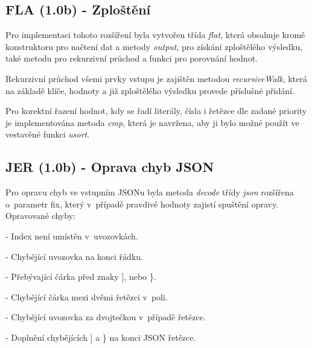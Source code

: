 \documentclass[10pt,a4paper]{article}
\begin{document}
	\subsection{FLA (1.0b) - Zploštění}
		Pro implementaci tohoto rozšíření byla vytvořen třída \textit{flat}, která obsahuje kromě konstruktoru pro načtení dat a metody \textit{output}, pro získání zploštělého výsledku, také metodu pro rekurzivní průchod a funkci pro porovnání hodnot.
		
		Rekurzivní průchod všemi prvky vstupu je zajištěn metodou \textit{recursiveWalk}, která na základě klíče, hodnoty a již zploštělého výsledku provede příslušné přidání. 
		
		Pro korektní řazení hodnot, kdy se řadí literály, čísla i řetězce dle zadané priority je implementována metoda \textit{cmp}, která je navržena, aby ji bylo možné použít ve vestavěné funkci \textit{usort}.
		
	\subsection{JER (1.0b) - Oprava chyb JSON}
		Pro opravu chyb ve vstupním JSONu byla metoda \textit{decode} třídy \textit{json} rozšířena o~parametr fix, který v~případě pravdivé hodnoty zajistí spuštění opravy.
		Opravované chyby:
			
			- Index není umístěn v~uvozovkách.
			
			- Chybějící uvozovka na konci řádku.
			
			- Přebývající čárka před znaky ], nebo \}.
			
			- Chybějící čárka mezi dvěmi řetězci v~poli.
			
			- Chybějící uvozovka za dvojtečkou v~případě řetězce.
			
			- Doplnění chybějících ] a \} na konci JSON řetězce.
\end{document}

